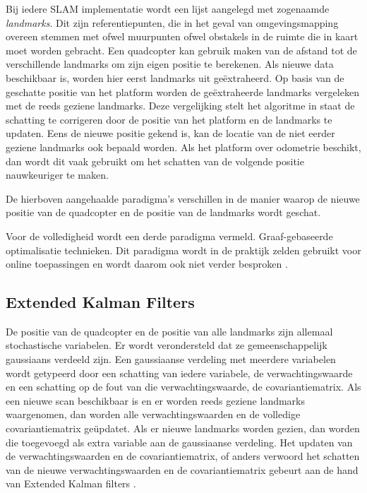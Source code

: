 \npar Bij iedere SLAM implementatie wordt een lijst aangelegd met zogenaamde \textit{landmarks}. Dit zijn referentiepunten, die in het geval van omgevingsmapping overeen stemmen met ofwel muurpunten ofwel obstakels in de ruimte die in kaart moet worden gebracht. Een quadcopter kan gebruik maken van de afstand tot de verschillende landmarks om zijn eigen positie te berekenen. Als nieuwe data beschikbaar is, worden hier eerst landmarks uit ge\"extraheerd. Op basis van de geschatte positie van het platform worden de ge\"extraheerde landmarks vergeleken met de reeds geziene landmarks. Deze vergelijking stelt het algoritme in staat de schatting te corrigeren door de positie van het platform en de landmarks te updaten. Eens de nieuwe positie gekend is, kan de locatie van de niet eerder geziene landmarks ook bepaald worden. Als het platform over odometrie beschikt, dan wordt dit vaak gebruikt om het schatten van de volgende positie nauwkeuriger te maken.

\npar De hierboven aangehaalde paradigma's verschillen in de manier waarop de nieuwe positie van de quadcopter en de positie van de landmarks wordt geschat.

\npar Voor de volledigheid wordt een derde paradigma vermeld. Graaf-gebaseerde optimalisatie technieken. Dit paradigma wordt in de praktijk zelden gebruikt voor online toepassingen en wordt daarom ook niet verder besproken \cite{book:SLAMHandbook}.

\subsection{Extended Kalman Filters}
De positie van de quadcopter en de positie van alle landmarks zijn allemaal stochastische variabelen. Er wordt verondersteld dat ze gemeenschappelijk gaussiaans verdeeld zijn. Een gaussiaanse verdeling met meerdere variabelen wordt getypeerd door een schatting van iedere variabele, de verwachtingswaarde en een schatting op de fout van die verwachtingswaarde, de covariantiematrix. Als een nieuwe scan beschikbaar is en er worden reeds geziene landmarks waargenomen, dan worden alle verwachtingswaarden en de volledige covariantiematrix ge\"updatet. Als er nieuwe landmarks worden gezien, dan worden die toegevoegd als extra variable aan de gaussiaanse verdeling. Het updaten van de verwachtingswaarden en de covariantiematrix, of anders verwoord het schatten van de nieuwe verwachtingswaarden en de covariantiematrix gebeurt aan de hand van Extended Kalman filters \cite{book:SLAMHandbook}.

